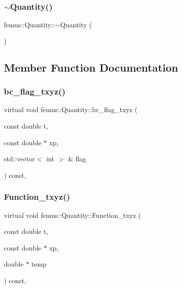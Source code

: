 \mbox{\label{classfemus_1_1_quantity_a1603aa15c52a3f48faab214b59144618}} 
\subsubsection{\texorpdfstring{$\sim$\+Quantity()}{~Quantity()}}
{\footnotesize\ttfamily femus\+::\+Quantity\+::$\sim$\+Quantity (\begin{DoxyParamCaption}{ }\end{DoxyParamCaption})}



\subsection{Member Function Documentation}
\mbox{\label{classfemus_1_1_quantity_af66356d64a9c4db62e3c6beba47acee9}} 
\subsubsection{\texorpdfstring{bc\+\_\+flag\+\_\+txyz()}{bc\_flag\_txyz()}}
{\footnotesize\ttfamily virtual void femus\+::\+Quantity\+::bc\+\_\+flag\+\_\+txyz (\begin{DoxyParamCaption}\item[{const double}]{t,  }\item[{const double $\ast$}]{xp,  }\item[{std\+::vector$<$ int $>$ \&}]{flag }\end{DoxyParamCaption}) const\hspace{0.3cm}{\ttfamily [inline]}, {\ttfamily [virtual]}}

\mbox{\label{classfemus_1_1_quantity_aa0a592f1d473218253cbcb1e557a24f6}} 
\subsubsection{\texorpdfstring{Function\+\_\+txyz()}{Function\_txyz()}}
{\footnotesize\ttfamily virtual void femus\+::\+Quantity\+::\+Function\+\_\+txyz (\begin{DoxyParamCaption}\item[{const double}]{t,  }\item[{const double $\ast$}]{xp,  }\item[{double $\ast$}]{temp }\end{DoxyParamCaption}) const\hspace{0.3cm}{\ttfamily [inline]}, {\ttfamily [virtual]}}

